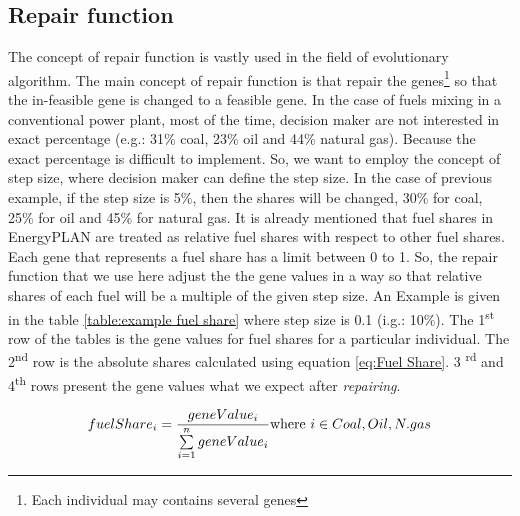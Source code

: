 \documentclass{article}
\begin{document}
\subsection{Repair function}
The concept of repair function \cite{Bonissone_Subbu_Eklund_Kiehl_2006} is vastly used in the field of evolutionary algorithm. 
The main concept of repair function is that repair the genes\footnote{Each individual may contains several genes} so that the in-feasible gene is changed to a feasible gene. 
In the case of fuels mixing in a conventional power plant, most of the time, decision maker are not interested in exact percentage (e.g.: 31\% coal, 23\% oil and 44\% natural gas).
Because the exact percentage is difficult to implement. 
So, we want to employ the concept of step size, where decision maker can define the step size. 
In the case of previous example, if the step size is 5\%, then the shares will be changed,  30\% for coal, 25\% for oil and 45\% for natural gas.
It is already mentioned that fuel shares in EnergyPLAN are treated as relative fuel shares with respect to other fuel shares. 
Each gene that represents a fuel share has a limit between 0 to 1. 
So, the repair function that we use here adjust the the gene values in a way so that relative shares of each fuel will be a multiple of the given step size. 
An Example is given in the table \ref{table:example fuel share} where step size is 0.1 (i.g.: 10\%).
The 1\textsuperscript{st} row of the tables is the gene values for fuel shares for a particular individual. 
The 2\textsuperscript{nd} row is the absolute shares calculated using equation \eqref{eq:Fuel Share}.
3 \textsuperscript{rd} and 4\textsuperscript{th} rows present the gene values what we expect after \textit{repairing}.

\begin{equation}
\label{eq:Fuel Share}
fuelShare_i = \frac{geneValue_{i}}{\sum\limits_{i=1}^n geneValue_{i}} \\ \text{where }
i \in {Coal, Oil, N. gas}
\end{equation}  
\end{document}
